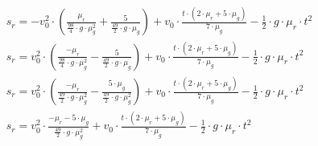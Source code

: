 \begin{align}
    s_r = - v_0^2 \cdot (\frac{\mu_r}{\frac{98}{4} \cdot g \cdot \mu_g^2} + \frac{5}{\frac{49}{2} \cdot g \cdot \mu_g}) + v_0 \cdot \frac{t \cdot (2 \cdot \mu_r + 5 \cdot \mu_g)}{7 \cdot \mu_g} - \frac{1}{2} \cdot g \cdot \mu_r \cdot t^2\\
    s_r = v_0^2 \cdot (\frac{-\mu_r}{\frac{98}{4} \cdot g \cdot \mu_g^2} - \frac{5}{\frac{49}{2} \cdot g \cdot \mu_g}) + v_0 \cdot \frac{t \cdot (2 \cdot \mu_r + 5 \cdot \mu_g)}{7 \cdot \mu_g} - \frac{1}{2} \cdot g \cdot \mu_r \cdot t^2\\
    s_r = v_0^2 \cdot (\frac{-\mu_r}{\frac{49}{2} \cdot g \cdot \mu_g^2} - \frac{5 \cdot \mu_g}{\frac{49}{2} \cdot g \cdot \mu_g^2}) + v_0 \cdot \frac{t \cdot (2 \cdot \mu_r + 5 \cdot \mu_g)}{7 \cdot \mu_g} - \frac{1}{2} \cdot g \cdot \mu_r \cdot t^2\\
    s_r = v_0^2 \cdot \frac{-\mu_r - 5 \cdot \mu_g}{\frac{49}{2} \cdot g \cdot \mu_g^2} + v_0 \cdot \frac{t \cdot (2 \cdot \mu_r + 5 \cdot \mu_g)}{7 \cdot \mu_g} - \frac{1}{2} \cdot g \cdot \mu_r \cdot t^2
\end{align}

